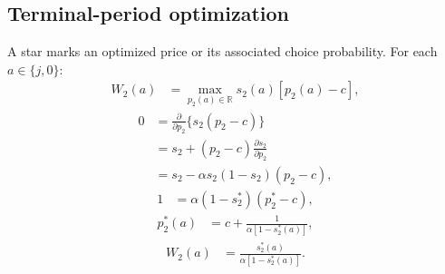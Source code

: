 \documentclass[11pt]{article}
\newcommand{\R}{\mathbb{R}}
\begin{document}
\subsection{Terminal-period optimization}
A star marks an optimized price or its associated choice probability.
For each $a\in\{j,0\}$:
\begin{equation}
\begin{aligned}
W_2(a)&=\max_{p_2(a)\in\R}s_2(a)[p_2(a)-c],
\end{aligned}
\end{equation}
\begin{equation}
\begin{aligned}
0&=\frac{\partial}{\partial p_2}\{s_2(p_2-c)\}\\[3pt]
&=s_2+(p_2-c)\frac{\partial s_2}{\partial p_2}\\[3pt]
&=s_2-\alpha s_2(1-s_2)(p_2-c),
\end{aligned}
\end{equation}
\begin{equation}
\begin{aligned}
1&=\alpha(1-s_2^*)(p_2^*-c),
\end{aligned}
\end{equation}
\begin{equation}
\begin{aligned}
p_2^*(a)&=c+\frac1{\alpha[1-s_2^*(a)]},
\end{aligned}
\end{equation}
\begin{equation}
\begin{aligned}
W_2(a)&=\frac{s_2^*(a)}{\alpha[1-s_2^*(a)]}.
\end{aligned}
\end{equation}
\end{document}
